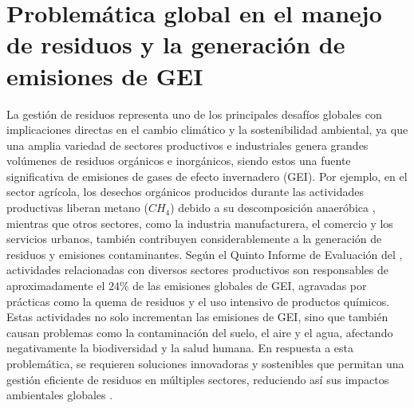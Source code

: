 \section{Problemática global en el manejo de residuos y la generación de emisiones de GEI}
La gestión de residuos representa uno de los principales desafíos globales con implicaciones directas en el cambio climático y la sostenibilidad ambiental, ya que una amplia variedad de sectores productivos e industriales genera grandes volúmenes de residuos orgánicos e inorgánicos, siendo estos una fuente significativa de emisiones de gases de efecto invernadero (GEI). Por ejemplo, en el sector agrícola, los desechos orgánicos producidos durante las actividades productivas liberan metano ($CH_4$) debido a su descomposición anaeróbica \parencite{FAO2021}, mientras que otros sectores, como la industria manufacturera, el comercio y los servicios urbanos, también contribuyen considerablemente a la generación de residuos y emisiones contaminantes. Según el Quinto Informe de Evaluación del \textcite{IPCC2014}, actividades relacionadas con diversos sectores productivos son responsables de aproximadamente el $24\%$ de las emisiones globales de GEI, agravadas por prácticas como la quema de residuos y el uso intensivo de productos químicos. Estas actividades no solo incrementan las emisiones de GEI, sino que también causan problemas como la contaminación del suelo, el aire y el agua, afectando negativamente la biodiversidad y la salud humana. En respuesta a esta problemática, se requieren soluciones innovadoras y sostenibles que permitan una gestión eficiente de residuos en múltiples sectores, reduciendo así sus impactos ambientales globales \parencite{ahmedAgricultureClimateChange2020}.

